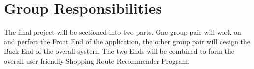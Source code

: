 \documentclass[10pt, a4paper, onecolumn]{scrartcl}
\begin{document}
	\section{Group Responsibilities}
	
	The final project will be sectioned into two parts. One group pair will work on and perfect the Front End of the application, the other group pair will design the Back End of the overall system. The two Ends will be combined to form the overall user friendly Shopping Route Recommender Program. 
	

	
		
		
\end{document}
